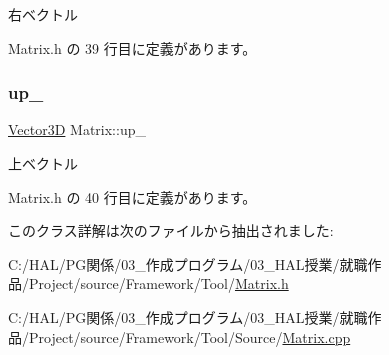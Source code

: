 右ベクトル 



 Matrix.\+h の 39 行目に定義があります。

\mbox{\label{class_matrix_a1b63002dc85564fe623cd0ad5646cc2e}} 
\subsubsection{\texorpdfstring{up\+\_\+}{up\_}}
{\footnotesize\ttfamily \mbox{\hyperlink{class_vector3_d}{Vector3D}} Matrix\+::up\+\_\+\hspace{0.3cm}{\ttfamily [private]}}



上ベクトル 



 Matrix.\+h の 40 行目に定義があります。



このクラス詳解は次のファイルから抽出されました\+:\begin{DoxyCompactItemize}
\item 
C\+:/\+H\+A\+L/\+P\+G関係/03\+\_\+作成プログラム/03\+\_\+\+H\+A\+L授業/就職作品/\+Project/source/\+Framework/\+Tool/\mbox{\hyperlink{_matrix_8h}{Matrix.\+h}}\item 
C\+:/\+H\+A\+L/\+P\+G関係/03\+\_\+作成プログラム/03\+\_\+\+H\+A\+L授業/就職作品/\+Project/source/\+Framework/\+Tool/\+Source/\mbox{\hyperlink{_matrix_8cpp}{Matrix.\+cpp}}\end{DoxyCompactItemize}
